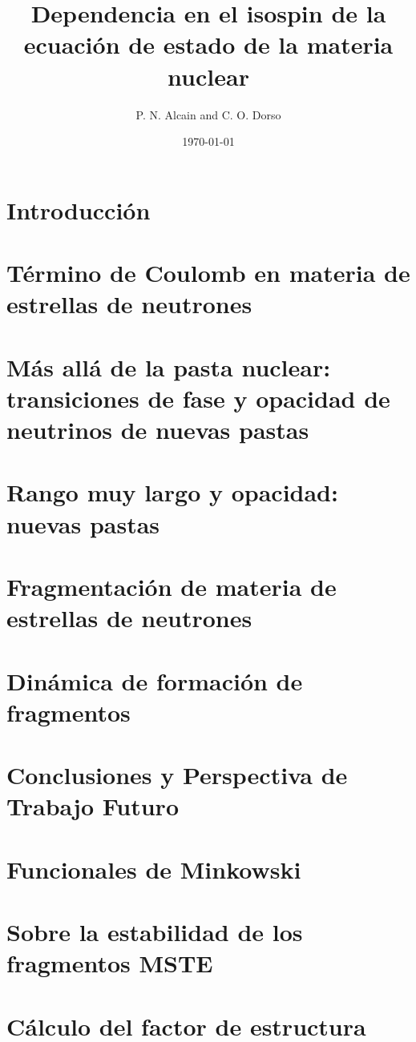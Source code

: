 \documentclass[12pt]{book}
\begin{document}
\title{Dependencia en el isospin de la ecuación de estado de la materia nuclear}

\author{P. N. Alcain and C. O. Dorso}

\date{\today}
\maketitle
\tableofcontents

\chapter[Introducción]{Introducción}
\label{ch:introduccion}



\chapter[Efecto de Coulomb]{Término de Coulomb en materia de estrellas de neutrones}
\label{ch:coulomb}


\chapter[Transiciones de fase]{Más allá de la pasta nuclear: transiciones de fase y opacidad de neutrinos de nuevas pastas}
\label{ch:transicion}


\chapter[Nuevas pastas]{Rango muy largo y opacidad: nuevas pastas}
\label{ch:nuevas_pastas}


\chapter[Fragmentación]{Fragmentación de materia de estrellas de neutrones}
\label{ch:fragmentacion}


\chapter[Formación de fragmentos]{Dinámica de formación de fragmentos}
\label{ch:dinamica}


\chapter[Conclusiones]{Conclusiones y Perspectiva de Trabajo Futuro}
\label{ch:conclusiones}


\appendix
\chapter{Funcionales de Minkowski}
\label{ap:minkowski}


\chapter{Sobre la estabilidad de los fragmentos MSTE}
\label{ap:mste}


\chapter{Cálculo del factor de estructura}
\label{ap:sq}



\end{document}
